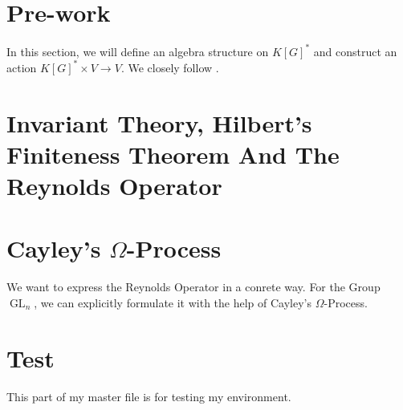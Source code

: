 \documentclass{article}
\theoremstyle{prrt}
\begin{document}
\section{Pre-work}
In this section, we will define an algebra structure on $K[G]^\ast$ and construct an action $K[G]^\ast \times V \longrightarrow V$.
We closely follow \cite[p. 299-302]{DK15}.

\bigskip



\section{Invariant Theory, Hilbert's Finiteness Theorem And The Reynolds Operator}



\section{Cayley's $\Omega$-Process}

We want to express the Reynolds Operator in a conrete way.
For the Group $\operatorname{GL}_n$, we can explicitly formulate it with the help of Cayley's $\Omega$-Process.



\section{Test}

This part of my master file is for testing my environment.




\end{document}
